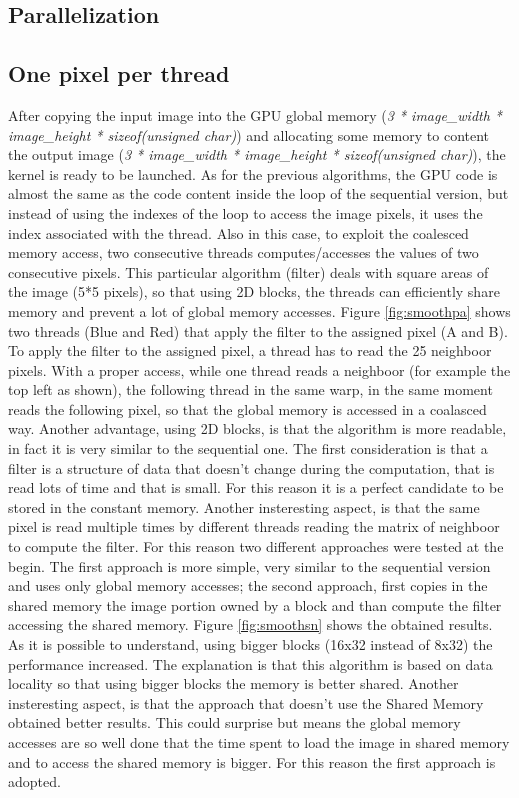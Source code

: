 \documentclass[a4paper]{article}
\begin{document}
\subsection{Parallelization}
\label{sec:p3}
\subsection{One pixel per thread}
\label{sec:opts}
After copying the input image into the GPU global memory (\textit{3 * image\_width * image\_height * sizeof(unsigned char)}) and allocating some memory to content the output image (\textit{3 * image\_width * image\_height * sizeof(unsigned char)}), the kernel is ready to be launched. As for the previous algorithms, the GPU code is almost the same as the code content inside the loop of the sequential version, but instead of using the indexes of the loop to access the image pixels, it uses the index associated with the thread. Also in this case, to exploit the coalesced memory access, two consecutive threads computes/accesses the values of two consecutive pixels.
This particular algorithm (filter) deals with square areas of the image (5*5 pixels), so that using 2D blocks, the threads can efficiently share memory and prevent a lot of global memory accesses. Figure \ref{fig:smoothpa} shows two threads (Blue and Red) that apply the filter to the assigned pixel (A and B). To apply the filter to the assigned pixel, a thread has to read the 25 neighboor pixels. With a proper access, while one thread reads a neighboor (for example the top left as shown), the following thread in the same warp, in the same moment reads the following pixel, so that the global memory is accessed in a coalasced way. Another advantage, using 2D blocks, is that the algorithm is more readable, in fact it is very similar to the sequential one. The first consideration is that a filter is a structure of data that doesn't change during the computation, that is read lots of time and that is small. For this reason it is a perfect candidate to be stored in the constant memory. Another insteresting aspect, is that the same pixel is read multiple times by different threads reading the matrix of neighboor to compute the filter. For this reason two different approaches were tested at the begin. The first approach is more simple, very similar to the sequential version and uses only global memory accesses; the second approach, first copies in the shared memory the image portion owned by a block and than compute the filter accessing the shared memory. Figure \ref{fig:smoothsn} shows the obtained results. As it is possible to understand, using bigger blocks (16x32 instead of 8x32) the performance increased. The explanation is that this algorithm is based on data locality so that using bigger blocks the memory is better shared. Another insteresting aspect, is that the approach that doesn't use the Shared Memory obtained better results. This could surprise but means the global memory accesses are so well done that the time spent to load the image in shared memory and to access the shared memory is bigger. For this reason the first approach is adopted.
\end{document}
